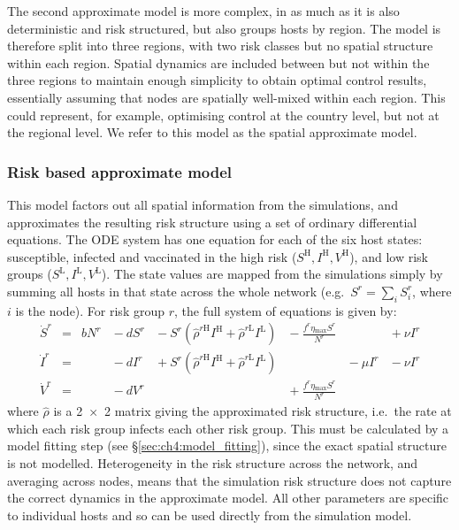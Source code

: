 The second approximate model is more complex, in as much as it is also deterministic and risk structured, but also groups hosts by region. The model is therefore split into three regions, with two risk classes but no spatial structure within each region. Spatial dynamics are included between but not within the three regions to maintain enough simplicity to obtain optimal control results, essentially assuming that nodes are spatially well-mixed within each region. This could represent, for example, optimising control at the country level, but not at the regional level. We refer to this model as the spatial approximate model.

\subsubsection*{Risk based approximate model}

This model factors out all spatial information from the simulations, and approximates the resulting risk structure using a set of ordinary differential equations. The ODE system has one equation for each of the six host states: susceptible, infected and vaccinated in the high risk ($S^\mathrm{H}, I^\mathrm{H}, V^\mathrm{H}$), and low risk groups ($S^\mathrm{L}, I^\mathrm{L}, V^\mathrm{L}$). The state values are mapped from the simulations simply by summing all hosts in that state across the whole network (e.g.\ $S^r = \sum_{i}S^r_i$, where $i$ is the node). For risk group $r$, the full system of equations is given by:
\begin{subequations}\label{eqn:ch4:risk_model}
\begin{alignat}{7}
    \dot{S}^r &={} &bN^r &{}-{} dS^r &{}-{} S^r\left(\hat{\rho}^{r\mathrm{H}}I^{\mathrm{H}} + \hat{\rho}^{r\mathrm{L}}I^{\mathrm{L}}\right) &{}-{} \frac{f^r\eta{}_\mathrm{max}S^r}{N^r} &&{}+{} \nu{}I^r \\
    \dot{I}^r &={}  &&{}-{} dI^r &{}+{} S^r\left(\hat{\rho}^{r\mathrm{H}}I^{\mathrm{H}} + \hat{\rho}^{r\mathrm{L}}I^{\mathrm{L}}\right)& &{}-{} \mu{}I^r &{}-{} \nu{}I^r \\
    \dot{V}^r &={}  &&{}-{} dV^r &&{}+{} \frac{f^r\eta{}_\mathrm{max}S^r}{N^r}&&
\end{alignat}
\end{subequations}
where $\hat{\rho}$ is a \num{2x2} matrix giving the approximated risk structure, i.e.\ the rate at which each risk group infects each other risk group. This must be calculated by a model fitting step (see \S\ref{sec:ch4:model_fitting}), since the exact spatial structure is not modelled. Heterogeneity in the risk structure across the network, and averaging across nodes, means that the simulation risk structure does not capture the correct dynamics in the approximate model. All other parameters are specific to individual hosts and so can be used directly from the simulation model.


